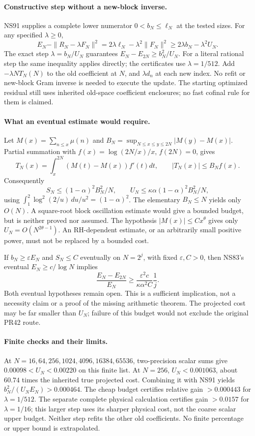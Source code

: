\paragraph{Constructive step without a new-block inverse.}
NS91 supplies a complete lower numerator $0<b_N\le\ell_N$ at the
tested sizes. For any specified $\lambda\ge0$,
\[
 E_N-\|R_N-\lambda F_N\|^2
 =2\lambda\ell_N-\lambda^2\|F_N\|^2
 \ge2\lambda b_N-\lambda^2U_N.
\]
The exact step $\lambda=b_N/U_N$ guarantees
$E_N-E_{2N}\ge b_N^2/U_N$. For a literal rational step the same
inequality applies directly; the certificates use $\lambda=1/512$.
Add $-\lambda NT_N(N)$ to the old coefficient at $N$, and
$\lambda d_n$ at each new index. No refit or new-block Gram inverse is
needed to execute the update. The starting optimized residual still uses
inherited old-space coefficient enclosures; no fast cofinal rule for them
is claimed.

\paragraph{What an eventual estimate would require.}
Let $M(x)=\sum_{n\le x}\mu(n)$ and
$B_N=\sup_{N\le x\le y\le2N}|M(y)-M(x)|$.
Partial summation with $f(x)=\log(2N/x)/x$, $f(2N)=0$, gives
\[
 T_N(x)=\int_x^{2N}(M(t)-M(x))f'(t)dt,\qquad
 |T_N(x)|\le B_N f(x).
\]
Consequently
\begin{equation}\label{ns92-oscillation}
 S_N\le (1-\alpha)^2B_N^2/N,\qquad
 U_N\le\kappa\alpha(1-\alpha)^2B_N^2/N,
\end{equation}
using $\int_1^2\log^2(2/u)\,du/u^2=(1-\alpha)^2$.
The elementary $B_N\le N$ yields only $O(N)$. A square-root block
oscillation estimate would give a bounded budget, but is neither proved
nor assumed. The hypothesis $|M(x)|\le Cx^\theta$ gives only
$U_N=O(N^{2\theta-1})$. An RH-dependent estimate, or an arbitrarily
small positive power, must not be replaced by a bounded cost.

If $b_N\ge\varepsilon E_N$ and $S_N\le C$ eventually on $N=2^j$,
with fixed $\varepsilon,C>0$, then NS83's eventual $E_N\ge c/\log N$
implies
\[
 \frac{E_N-E_{2N}}{E_N}\ge
 \frac{\varepsilon^2c}{\kappa\alpha^2 C}\frac1j.
\]
Both eventual hypotheses remain open. This is a sufficient implication,
not a necessity claim or a proof of the missing arithmetic theorem.
The projected cost may be far smaller than $U_N$; failure of this budget
would not exclude the original PR42 route.

\paragraph{Finite checks and their limits.}
At $N=16,64,256,1024,4096,16384,65536$, two-precision scalar sums give
$0.00098<U_N<0.00220$ on this finite list. At $N=256$, $U_N<0.001063$,
about $60.74$ times the inherited true projected cost. Combining it with
NS91 yields $b_N^2/(U_NE_N)>0.000464$. The cheap budget certifies relative gain $>0.000443$ for $\lambda=1/512$.
The separate complete physical calculation certifies gain $>0.0157$ for
$\lambda=1/16$; this larger step uses its sharper physical cost, not the
coarse scalar upper budget. Neither step refits the other old coefficients.
No finite percentage or upper bound is extrapolated.

